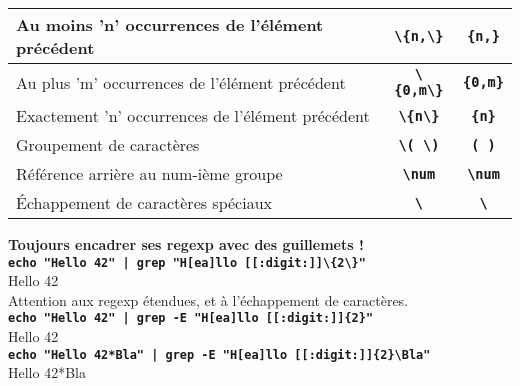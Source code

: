 \documentclass[11pt,a4paper]{article}
\newcommand{\TTBF}[1]{\texttt{\textbf{#1}}}	%
\begin{document}
\begin{center}
\begin{tabular}{ M{5cm} | c | c }
	Au moins 'n' occurrences de l'élément précédent & \TTBF{\textquotesingle \textbackslash \{n,\textbackslash \}\textquotesingle} & \TTBF{\textquotesingle \{n,\}\textquotesingle} \\ \hline
	Au plus 'm' occurrences de l'élément précédent & \TTBF{\textquotesingle \textbackslash \{0,m\textbackslash \}\textquotesingle} & \TTBF{\textquotesingle \{0,m\}\textquotesingle} \\ \hline
	Exactement 'n' occurrences de l'élément précédent & \TTBF{\textquotesingle \textbackslash \{n\textbackslash \}\textquotesingle} & \TTBF{\textquotesingle \{n\}\textquotesingle} \\ \hline
	Groupement de caractères & \TTBF{\textquotesingle \textbackslash ( \textbackslash )\textquotesingle} & \TTBF{\textquotesingle ( )\textquotesingle} \\ \hline
	Référence arrière au num-ième groupe & \TTBF{\textquotesingle \textbackslash num\textquotesingle} & \TTBF{\textquotesingle \textbackslash num\textquotesingle} \\ \hline
	\'Echappement de caractères spéciaux & \TTBF{\textquotesingle \textbackslash \textquotesingle} & \TTBF{\textquotesingle \textbackslash \textquotesingle}
	\end{tabular}
\end{center}


\bigskip

\noindent \textbf{Toujours encadrer ses regexp avec des guillemets !}\\

\noindent \TTBF{echo "Hello 42" | grep "H[ea]llo [[:digit:]]\textbackslash \{2\textbackslash \}"}\\
\noindent \textrightarrow Hello 42\\

\noindent Attention aux regexp étendues, et à l'échappement de caractères.\\
\noindent \TTBF{echo "Hello 42" | grep -E "H[ea]llo [[:digit:]]\{2\}"}\\
\noindent \textrightarrow Hello 42\\

\noindent \TTBF{echo "Hello 42*Bla" | grep -E "H[ea]llo [[:digit:]]\{2\}\textbackslash *Bla"}\\
\noindent \textrightarrow Hello 42*Bla\\

\end{document}
